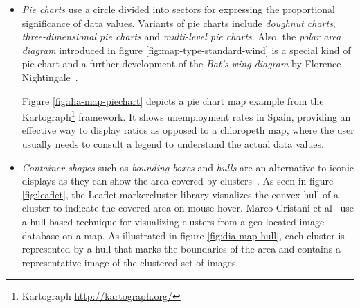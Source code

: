 \begin{itemize}
\begin{itemize}
{    
    \label{fig:dia-map-barchart}
}


\item \textit{Pie charts} use a circle divided into sectors for expressing the proportional significance of data values. Variants of pie charts include \textit{doughnut charts}, \textit{three-dimensional pie charts} and \textit{multi-level pie charts}. Also, the \textit{polar area diagram} introduced in figure \ref{fig:map-type-standard-wind} is a special kind of pie chart and a further development of the \textit{Bat's wing diagram} by Florence Nightingale~\cite{night98bart}.

Figure \ref{fig:dia-map-piechart} depicts a pie chart map example from the Kartograph\footnote{Kartograph \url{http://kartograph.org/}} framework. It shows unemployment rates in Spain, providing an effective way to display ratios as opposed to a chloropeth map, where the user usually needs to consult a legend to understand the actual data values.

\item \textit{Container shapes} such as \textit{bounding boxes} and \textit{hulls} are an alternative to iconic displays as they can show the area covered by clusters~\cite{Delort10vis}. As seen in figure \ref{fig:leaflet}, the Leaflet.markercluster library visualizes the convex hull of a cluster to indicate the covered area on mouse-hover. Marco Cristani et al~\cite{Cristani08geoimagemaps} use a hull-based technique for visualizing clusters from a geo-located image database on a map. As illustrated in figure \ref{fig:dia-map-hull}, each cluster is represented by a hull that marks the boundaries of the area and contains a representative image of the clustered set of images.



\end{itemize}
\end{itemize}
